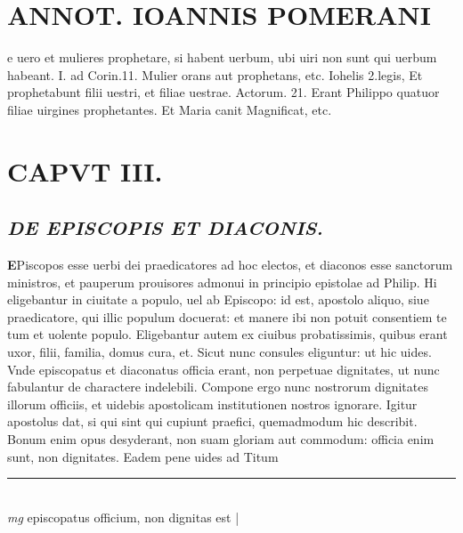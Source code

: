\documentclass{article}
\begin{document}
\begin{pages}
\section*{ANNOT. IOANNIS POMERANI }\pstart e uero et mulieres prophetare, si habent uerbum, ubi uiri non sunt qui uerbum habeant. I. ad Corin.11. Mulier orans aut prophetans, etc. Iohelis 2.legis, Et prophetabunt filii uestri, et filiae uestrae. Actorum. 21. Erant Philippo quatuor filiae uirgines prophetantes. Et Maria canit Magnificat, etc.  \pend
\endnumbering\beginnumbering\section{CAPVT III.}
{}
\subsection*{\textit{DE EPISCOPIS ET DIACONIS. }}\pstart \huge\textbf{E}\normalsize Piscopos esse uerbi dei praedicatores ad hoc electos, et diaconos esse sanctorum ministros, et pauperum prouisores admonui in principio epistolae ad Philip. Hi eligebantur in ciuitate a populo, uel ab Episcopo: id est, apostolo aliquo, siue praedicatore, qui illic populum docuerat: et manere ibi non potuit consentiem te tum et uolente populo. Eligebantur autem ex ciuibus probatissimis, quibus erant uxor, filii, familia, domus cura, et. Sicut nunc consules eliguntur: ut hic uides. Vnde episcopatus et diaconatus officia erant, non perpetuae dignitates, ut nunc fabulantur de charactere indelebili. Compone ergo nunc nostrorum dignitates illorum officiis, et uidebis apostolicam institutionen nostros ignorare. Igitur apostolus dat, si qui sint qui cupiunt praefici, quemadmodum hic describit. Bonum enim opus desyderant, non suam gloriam aut commodum: officia enim sunt, non dignitates. Eadem pene uides ad Titum  \pend
\vspace{0.5cm}\noindent
\vspace{0.2cm}\rule{1cm}{0.2pt}\\ 
\hspace{0.2cm}\textit{mg}
\footnotesize episcopatus officium, non dignitas est 
\normalsize| 
\endnumbering
\end{pages}
\end{document}
